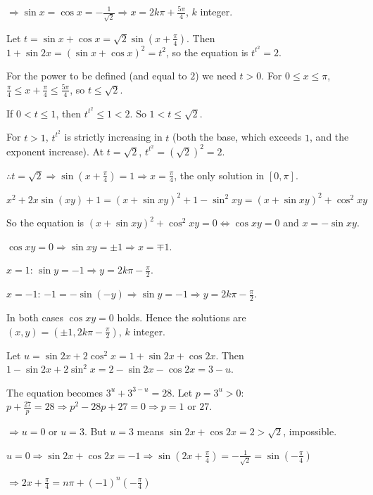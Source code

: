   $\Rightarrow\sin x = \cos x = -\frac{1}{\sqrt{2}}\Rightarrow x = 2k\pi + \frac{5\pi}{4}$, $k$ integer.
\item Let $t = \sin x + \cos x = \sqrt{2}\sin\left(x + \frac{\pi}{4}\right)$. Then $1 + \sin2x = (\sin x + \cos
  x)^2 = t^2$, so the equation is $t^{t^2} = 2$.

  For the power to be defined (and equal to $2$) we need $t > 0$. For $0\le x\le\pi$, $\frac{\pi}{4}\le x +
  \frac{\pi}{4}\le\frac{5\pi}{4}$, so $t\le\sqrt{2}$.

  If $0 < t\le 1$, then $t^{t^2}\le 1 < 2$. So $1 < t\le\sqrt{2}$.

  For $t > 1$, $t^{t^2}$ is strictly increasing in $t$ (both the base, which exceeds $1$, and the exponent
  increase). At $t = \sqrt{2}$, $t^{t^2} = \left(\sqrt{2}\right)^2 = 2$.

  $\therefore t = \sqrt{2}\Rightarrow\sin\left(x + \frac{\pi}{4}\right) = 1\Rightarrow x = \frac{\pi}{4}$, the
  only solution in $[0, \pi]$.
\item $x^2 + 2x\sin(xy) + 1 = (x + \sin xy)^2 + 1 - \sin^2xy = (x + \sin xy)^2 + \cos^2xy$

  So the equation is $(x + \sin xy)^2 + \cos^2xy = 0\Leftrightarrow\cos xy = 0$ and $x = -\sin xy$.

  $\cos xy = 0\Rightarrow\sin xy = \pm1\Rightarrow x = \mp1$.

  $x = 1$: $\sin y = -1\Rightarrow y = 2k\pi - \frac{\pi}{2}$.

  $x = -1$: $-1 = -\sin(-y)\Rightarrow\sin y = -1\Rightarrow y = 2k\pi - \frac{\pi}{2}$.

  In both cases $\cos xy = 0$ holds. Hence the solutions are $(x, y) = \left(\pm1, 2k\pi -
  \frac{\pi}{2}\right)$, $k$ integer.
\item Let $u = \sin2x + 2\cos^2x = 1 + \sin2x + \cos2x$. Then $1 - \sin2x + 2\sin^2x = 2 - \sin2x - \cos2x = 3 -
  u$.

  The equation becomes $3^u + 3^{3 - u} = 28$. Let $p = 3^u > 0$: $p + \frac{27}{p} = 28\Rightarrow p^2 - 28p + 27
  = 0\Rightarrow p = 1$ or $27$.

  $\Rightarrow u = 0$ or $u = 3$. But $u = 3$ means $\sin2x + \cos2x = 2 > \sqrt{2}$, impossible.

  $u = 0\Rightarrow\sin2x + \cos2x = -1\Rightarrow\sin\left(2x + \frac{\pi}{4}\right) = -\frac{1}{\sqrt{2}} =
  \sin\left(-\frac{\pi}{4}\right)$

  $\Rightarrow 2x + \frac{\pi}{4} = n\pi + (-1)^n\left(-\frac{\pi}{4}\right)$

